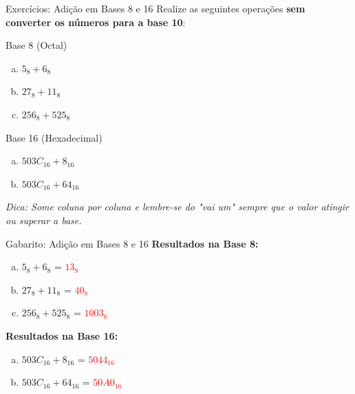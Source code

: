 \begin{frame}{Exercícios: Adição em Bases 8 e 16}
    Realize as seguintes operações \textbf{sem converter os números para a base 10}:

    \begin{block}{Base 8 (Octal)}
        \begin{enumerate}[a)]
            \item $5_8 + 6_8$
            \item $27_8 + 11_8$
            \item $256_8 + 525_8$
        \end{enumerate}
    \end{block}

    \vspace{0.5cm}

    \begin{block}{Base 16 (Hexadecimal)}
        \begin{enumerate}[a)]
            \item $503C_{16} + 8_{16}$
            \item $503C_{16} + 64_{16}$
        \end{enumerate}
    \end{block}

    \vspace{0.3cm}
    \small
    \textit{Dica: Some coluna por coluna e lembre-se do "vai um" sempre que o valor atingir ou superar a base.}
\end{frame}

\begin{frame}{Gabarito: Adição em Bases 8 e 16}
    \textbf{Resultados na Base 8:}
    \begin{enumerate}[a)]
        \item $5_8 + 6_8$ = \textcolor{red}{$13_8$}
        \item $27_8 + 11_8$ =  \textcolor{red}{$40_8$}
        \item $256_8 + 525_8$ = \textcolor{red}{$1003_8$}
    \end{enumerate}

    \vspace{0.6cm}

    \textbf{Resultados na Base 16:}
    \begin{enumerate}[a)]
        \item $503C_{16} + 8_{16}$ = \textcolor{red}{$5044_{16}$}
        \item $503C_{16} + 64_{16}$ = \textcolor{red}{$50A0_{16}$}
    \end{enumerate}
\end{frame}

